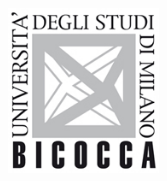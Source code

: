 \documentclass[12pt]{article}
\begin{document}
\begin{titlepage}

\includegraphics[width=0.3\textwidth]{logo.jpg}\\%
 

\vfill %

\end{titlepage}

\tableofcontents
\pagebreak
\end{document}
